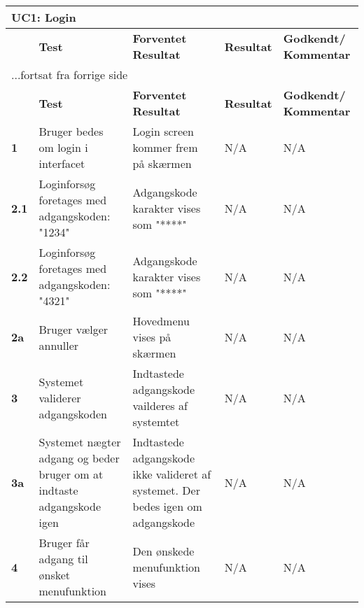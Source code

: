 
\begin{center}
\begin{longtable}{|p{}|p{}|p{}|p{}|p{}|} %
\hline
\multicolumn{5}{|l|}{\textbf{UC1: Login}} \\ \hline
\multicolumn{1}{|c|}{} &
\textbf{Test} &
\textbf{Forventet \newline Resultat} &
\textbf{Resultat} &
\textbf{Godkendt/ \newline Kommentar} \\ \hline 
\endfirsthead

\multicolumn{5}{l}{...fortsat fra forrige side} \\ \hline 
\multicolumn{1}{|c|}{} &
\textbf{Test} &
\textbf{Forventet \newline Resultat} &
\textbf{Resultat} &
\textbf{Godkendt/ \newline Kommentar} \\ \hline 
\endhead


\textbf{1}		
&Bruger bedes om login i interfacet
&Login screen kommer frem på skærmen 	
&N/A 	
&N/A \\\hline
\textbf{2.1}		
&Loginforsøg foretages med adgangskoden: "1234"	
&Adgangskode karakter vises som "****" 	
&N/A 	
&N/A \\\hline
\textbf{2.2}		
&Loginforsøg foretages med adgangskoden: "4321"	
&Adgangskode karakter vises som "****" 	
&N/A 	
&N/A \\\hline
\textbf{2a}		
&Bruger vælger annuller	
&Hovedmenu vises på skærmen 	
&N/A 	
&N/A \\\hline

\textbf{3}		
&Systemet validerer adgangskoden		
&Indtastede adgangskode vailderes af systemtet 	
&N/A 	
&N/A \\\hline
\textbf{3a}		
&Systemet nægter adgang og beder bruger om at indtaste adgangskode igen	
&Indtastede adgangskode ikke valideret af systemet. Der bedes igen om adgangskode	
&N/A 	
&N/A \\\hline
\textbf{4}		
&Bruger får adgang til ønsket menufunktion		
&Den ønskede menufunktion vises 	
&N/A 	
&N/A  \\\hline
	\end{longtable}
	\label{ATUC1} 
\end{center}